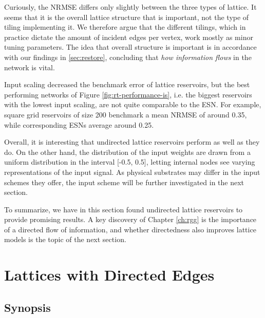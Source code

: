 Curiously, the NRMSE differs only slightly between the three types of
lattice. It seems that it is the overall lattice structure that is important,
not the type of tiling implementing it. We therefore argue that the different
tilings, which in practice dictate the amount of incident edges per vertex, work
mostly as minor tuning parameters. The idea that overall structure is important
is in accordance with our findings in \ref{sec:restore}, concluding that
\textit{how information flows} in the network is vital.

Input scaling decreased the benchmark error of lattice reservoirs, but the best
performing networks of Figure \ref{fig:rt-performance-is}, i.e. the biggest
reservoirs with the lowest input scaling, are not quite comparable to the
ESN. For example, square grid reservoirs of size 200 benchmark a mean NRMSE of
around 0.35, while corresponding ESNs average around 0.25.

Overall, it is interesting that undirected lattice reservoirs perform as well as
they do. On the other hand, the distribution of the input weights are drawn from
a uniform distribution in the interval [-0.5, 0.5], letting internal nodes see
varying representations of the input signal. As physical substrates may differ
in the input schemes they offer, the input scheme will be further investigated
in the next section.

To summarize, we have in this section found undirected lattice reservoirs to
provide promising results. A key discovery of Chapter \ref{ch:rgg} is the
importance of a directed flow of information, and whether directedness also
improves lattice models is the topic of the next section.

\section{Lattices with Directed Edges}
\label{sec:lat-dir-edge}

\subsection{Synopsis}


